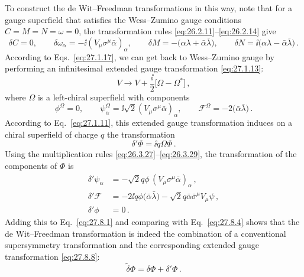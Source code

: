 To construct the de Wit--Freedman transformations in this way, note that for
a gauge superfield that satisfies the Wess--Zumino gauge conditions
\(C=M=N=\omega=0\), the transformation rules
\eqref{eq:26.2.11}--\eqref{eq:26.2.14} give
\begin{equation}
  \delta C=0,\qquad
  \delta\omega_\alpha=-\ii(V_\mu\sigma^\mu\bar\alpha)_\alpha,\qquad
  \delta M=-\bigl(\alpha\lambda+\bar\alpha\bar\lambda\bigr),\qquad
  \delta N=\ii\bigl(\alpha\lambda-\bar\alpha\bar\lambda\bigr)\,.
  \tag{27.8.5}\label{eq:27.8.5}
\end{equation}
According to Eqs.~\eqref{eq:27.1.17}, we can get back to Wess--Zumino gauge
by performing an infinitesimal extended gauge transformation
\eqref{eq:27.1.13}:
\begin{equation}
  V\longrightarrow V+\frac{\ii}{2}\bigl[\Omega-\Omega^*\bigr]\,,
  \tag{27.8.6}\label{eq:27.8.6}
\end{equation}
where \(\Omega\) is a left-chiral superfield with components
\begin{equation}
  \phi^\Omega=0,\qquad
  \psi_\alpha^\Omega
    =\ii\sqrt{2}(V_\mu\sigma^\mu\bar\alpha)_\alpha,\qquad
  \mathcal{F}^\Omega
  =-2\bigl(\bar\alpha\bar\lambda\bigr)\,.
  \tag{27.8.7}\label{eq:27.8.7}
\end{equation}
According to Eq.~\eqref{eq:27.1.11}, this extended gauge transformation
induces on a chiral superfield of charge \(q\) the transformation
\begin{equation}
  \delta'\Phi=\ii q\Omega\Phi\,.
  \tag{27.8.8}\label{eq:27.8.8}
\end{equation}
Using the multiplication rules
\eqref{eq:26.3.27}--\eqref{eq:26.3.29}, the transformation of the components
of \(\Phi\) is
\begin{equation}
  \begin{aligned}
    \delta'\psi_\alpha
    &=-\sqrt{2}q\phi\,
      (V_\mu\sigma^\mu\bar\alpha)_\alpha\,,\\
    \delta'\mathcal{F}
    &=-2\ii q\phi\bigl(\bar\alpha\bar\lambda\bigr)
      -\sqrt{2}q\bar\alpha\bar\sigma^\mu V_\mu\psi\,,\\
    \delta'\phi&=0\,.
  \end{aligned}
  \tag{27.8.9}\label{eq:27.8.9}
\end{equation}
Adding this to Eq.~\eqref{eq:27.8.1} and comparing with
Eq.~\eqref{eq:27.8.4} shows that the de Wit--Freedman transformation is
indeed the combination of a conventional supersymmetry transformation and
the corresponding extended gauge transformation \eqref{eq:27.8.8}:
\begin{equation}
  \widetilde{\delta}\Phi=\delta\Phi+\delta'\Phi\,.
  \tag{27.8.10}\label{eq:27.8.10}
\end{equation}
